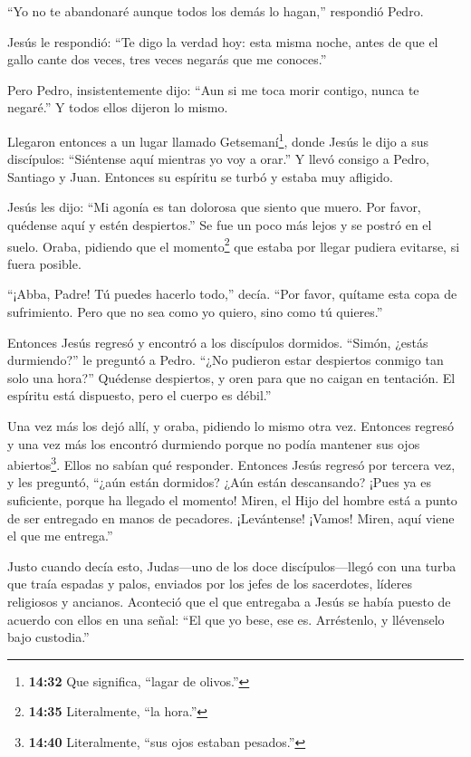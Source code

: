  ``Yo no te abandonaré aunque todos los demás lo hagan,''
respondió Pedro.

 Jesús le respondió: ``Te digo la verdad hoy: esta misma
noche, antes de que el gallo cante dos veces, tres veces negarás que me
conoces.''

 Pero Pedro, insistentemente dijo: ``Aun si me toca morir
contigo, nunca te negaré.'' Y todos ellos dijeron lo mismo.

 Llegaron entonces a un lugar llamado Getsemaní\footnote{\textbf{14:32}
  Que significa, ``lagar de olivos.''}, donde Jesús le dijo a sus
discípulos: ``Siéntense aquí mientras yo voy a orar.''  Y
llevó consigo a Pedro, Santiago y Juan. Entonces su espíritu se turbó y
estaba muy afligido.

 Jesús les dijo: ``Mi agonía es tan dolorosa que siento que
muero. Por favor, quédense aquí y estén despiertos.''  Se
fue un poco más lejos y se postró en el suelo. Oraba, pidiendo que el
momento\footnote{\textbf{14:35} Literalmente, ``la hora.''} que estaba
por llegar pudiera evitarse, si fuera posible.

 ``¡Abba, Padre! Tú puedes hacerlo todo,'' decía. ``Por
favor, quítame esta copa de sufrimiento. Pero que no sea como yo quiero,
sino como tú quieres.''

 Entonces Jesús regresó y encontró a los discípulos
dormidos. ``Simón, ¿estás durmiendo?'' le preguntó a Pedro. ``¿No
pudieron estar despiertos conmigo tan solo una hora?'' 
Quédense despiertos, y oren para que no caigan en tentación. El espíritu
está dispuesto, pero el cuerpo es débil.''

 Una vez más los dejó allí, y oraba, pidiendo lo mismo otra
vez.  Entonces regresó y una vez más los encontró durmiendo
porque no podía mantener sus ojos abiertos\footnote{\textbf{14:40}
  Literalmente, ``sus ojos estaban pesados.''}. Ellos no sabían qué
responder.  Entonces Jesús regresó por tercera vez, y les
preguntó, ``¿aún están dormidos? ¿Aún están descansando? ¡Pues ya es
suficiente, porque ha llegado el momento! Miren, el Hijo del hombre está
a punto de ser entregado en manos de pecadores. 
¡Levántense! ¡Vamos! Miren, aquí viene el que me entrega.''

 Justo cuando decía esto, Judas---uno de los doce
discípulos---llegó con una turba que traía espadas y palos, enviados por
los jefes de los sacerdotes, líderes religiosos y ancianos.
 Aconteció que el que entregaba a Jesús se había puesto de
acuerdo con ellos en una señal: ``El que yo bese, ese es. Arréstenlo, y
llévenselo bajo custodia.''

